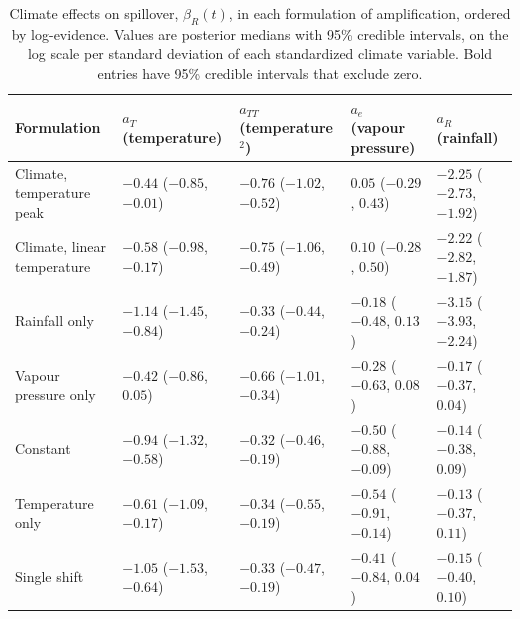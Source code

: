 \begin{table}[ht]
\centering
\small
\caption{Climate effects on spillover, $\beta_R(t)$, in each formulation of amplification, ordered by log-evidence. Values are posterior medians with 95\% credible intervals, on the log scale per standard deviation of each standardized climate variable. Bold entries have 95\% credible intervals that exclude zero.}
\label{tab:si_spillover_by_formulation}
\begin{tabular}{lllll}
\toprule
Formulation & $a_T$ (temperature) & $a_{TT}$ (temperature$^2$) & $a_e$ (vapour pressure) & $a_R$ (rainfall) \\
\midrule
Climate, temperature peak   & $\mathbf{-0.44}$ ($-0.85$, $-0.01$) & $\mathbf{-0.76}$ ($-1.02$, $-0.52$) & $0.05$ ($-0.29$, $0.43$) & $\mathbf{-2.25}$ ($-2.73$, $-1.92$) \\
Climate, linear temperature & $\mathbf{-0.58}$ ($-0.98$, $-0.17$) & $\mathbf{-0.75}$ ($-1.06$, $-0.49$) & $0.10$ ($-0.28$, $0.50$) & $\mathbf{-2.22}$ ($-2.82$, $-1.87$) \\
Rainfall only               & $\mathbf{-1.14}$ ($-1.45$, $-0.84$) & $\mathbf{-0.33}$ ($-0.44$, $-0.24$) & $-0.18$ ($-0.48$, $0.13$) & $\mathbf{-3.15}$ ($-3.93$, $-2.24$) \\
Vapour pressure only        & $-0.42$ ($-0.86$, $0.05$) & $\mathbf{-0.66}$ ($-1.01$, $-0.34$) & $-0.28$ ($-0.63$, $0.08$) & $-0.17$ ($-0.37$, $0.04$) \\
Constant                    & $\mathbf{-0.94}$ ($-1.32$, $-0.58$) & $\mathbf{-0.32}$ ($-0.46$, $-0.19$) & $\mathbf{-0.50}$ ($-0.88$, $-0.09$) & $-0.14$ ($-0.38$, $0.09$) \\
Temperature only            & $\mathbf{-0.61}$ ($-1.09$, $-0.17$) & $\mathbf{-0.34}$ ($-0.55$, $-0.19$) & $\mathbf{-0.54}$ ($-0.91$, $-0.14$) & $-0.13$ ($-0.37$, $0.11$) \\
Single shift                & $\mathbf{-1.05}$ ($-1.53$, $-0.64$) & $\mathbf{-0.33}$ ($-0.47$, $-0.19$) & $-0.41$ ($-0.84$, $0.04$) & $-0.15$ ($-0.40$, $0.10$) \\
\bottomrule
\end{tabular}
\end{table}
